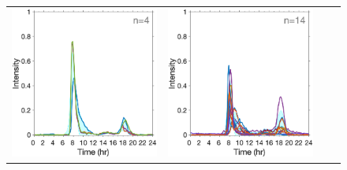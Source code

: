 \documentclass{article}
\begin{document}
\begin{figure}[h!]
\begin{center}
\begin{tabular}{cccc}
			\includegraphics[scale=0.1]{../2Fittedy/plot/weekday_7/fitted_y_cluster7_5.eps} 
			&\hspace*{-0.6cm}
			\includegraphics[scale=0.1]{../2Fittedy/plot/weekday_7/fitted_y_cluster7_6.eps} 

\end{tabular}
\end{center}
\end{figure}
\end{document}

